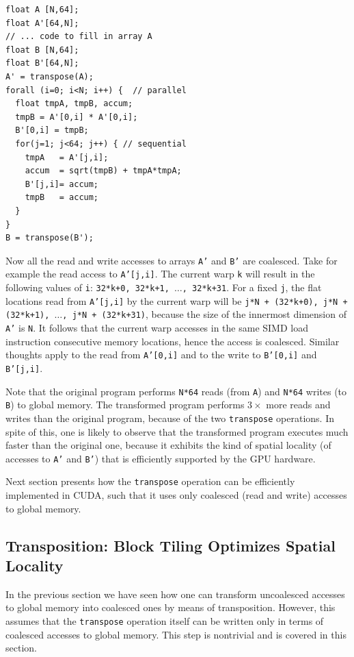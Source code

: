 \documentclass[acmsmall,review]{acmart}\settopmatter{printfolios=true,printccs=false,printacmref=false}
\begin{document}
\begin{lstlisting}[mathescape=true]
float A [N,64];
float A'[64,N];
// ... code to fill in array A
float B [N,64];
float B'[64,N];
A' = transpose(A);
forall (i=0; i<N; i++) {  // parallel
  float tmpA, tmpB, accum;
  tmpB = A'[0,i] * A'[0,i];
  B'[0,i] = tmpB;
  for(j=1; j<64; j++) { // sequential
    tmpA   = A'[j,i];
    accum  = sqrt(tmpB) + tmpA*tmpA;
    B'[j,i]= accum;
    tmpB   = accum;
  }
}
B = transpose(B');
\end{lstlisting}\vspace{-2ex}
Now all the read and write accesses to arrays {\tt A'} and {\tt B'} 
are coalesced. Take for example the read access to {\tt A'[j,i]}.
The current warp {\tt k} will result in the following values of {\tt i}: 
{\tt 32*k+0, 32*k+1, $\ldots$, 32*k+31}. For a fixed {\tt j}, the
flat locations read from {\tt A'[j,i]} by the current warp will be
{\tt j*N + (32*k+0), j*N + (32*k+1), $\ldots$, j*N + (32*k+31)}, 
because the size of the innermost dimension of {\tt A'} is {\tt N}.
It follows that the current warp accesses in the same SIMD
load instruction consecutive memory locations, hence the access is
coalesced. Similar thoughts apply to the read from {\tt A'[0,i]}
and to the write to {\tt B'[0,i]} and {\tt B'[j,i]}.

Note that the original program performs {\tt N*64} reads (from {\tt A}) 
and {\tt N*64} writes (to {\tt B}) to global memory. The transformed
program performs $3\times$ more reads and writes than the original
program, because of the two \lstinline{transpose} operations. 
In spite of this, one is likely to observe that the transformed program
executes much faster than the original one, because it exhibits the kind
of spatial locality (of accesses to {\tt A'} and {\tt B'}) that is efficiently
supported by the GPU hardware.

Next section presents how the \lstinline{transpose} operation can be
efficiently implemented in CUDA, such that it uses only coalesced
(read and write) accesses to global memory.
  
\subsection{Transposition: Block Tiling Optimizes Spatial Locality}
\label{subsec:transp}

In the previous section we have seen how one can transform uncoalesced
accesses to global memory into coalesced ones by means of transposition.
However, this assumes that the \lstinline{transpose} operation itself
can be written only in terms of coalesced accesses to global memory.
This step is nontrivial and is covered in this section. 
\end{document}

